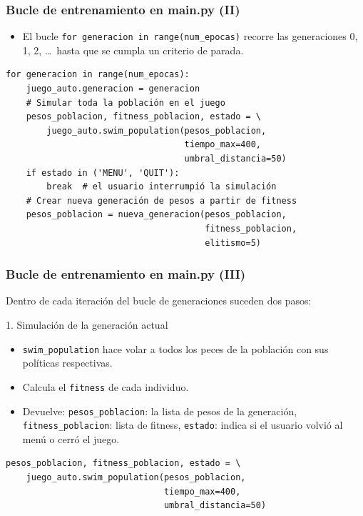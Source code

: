 \documentclass[
	11pt, %
]{beamer}
\begin{document}
\begin{frame}[fragile]
\frametitle{Bucle de entrenamiento en main.py (II)}

\begin{itemize}
    \item El bucle \texttt{for generacion in range(num\_epocas)} recorre
          las generaciones 0, 1, 2, \dots\ hasta que se cumpla un criterio
          de parada.
\end{itemize}

{\scriptsize
\begin{verbatim}
for generacion in range(num_epocas):
    juego_auto.generacion = generacion
    # Simular toda la población en el juego
    pesos_poblacion, fitness_poblacion, estado = \
        juego_auto.swim_population(pesos_poblacion,
                                   tiempo_max=400,
                                   umbral_distancia=50)
    if estado in ('MENU', 'QUIT'):
        break  # el usuario interrumpió la simulación
    # Crear nueva generación de pesos a partir de fitness
    pesos_poblacion = nueva_generacion(pesos_poblacion,
                                       fitness_poblacion,
                                       elitismo=5)
\end{verbatim}
}

\end{frame}


\begin{frame}[fragile]
\frametitle{Bucle de entrenamiento en main.py (III)}

Dentro de cada iteración del bucle de generaciones suceden dos pasos:

\vspace{6pt}
1. Simulación de la generación actual

\begin{itemize}
    \item \texttt{swim\_population} hace volar a todos los peces de la
          población con sus políticas respectivas.
    \item Calcula el \texttt{fitness} de cada individuo.
    \item Devuelve:
        \texttt{pesos\_poblacion}: la lista de pesos de la generación,
        \texttt{fitness\_poblacion}: lista de fitness,
        \texttt{estado}: indica si el usuario volvió al menú
              o cerró el juego.
\end{itemize}

{\scriptsize
\begin{verbatim}
pesos_poblacion, fitness_poblacion, estado = \
    juego_auto.swim_population(pesos_poblacion,
                               tiempo_max=400,
                               umbral_distancia=50)
\end{verbatim}
}

\end{frame}
\end{document}
